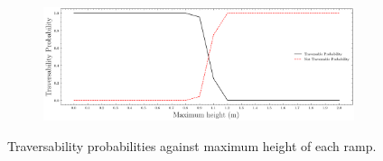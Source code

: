 \documentclass[../document.tex]{subfiles}
\begin{document}
\begin{figure}[htbp]
    \centering
    \begin{subfigure}[b]{1\linewidth}
    \includegraphics[width=\linewidth]{../img/5/custom_patches/ramp/predictions.png}
    \end{subfigure}
    \caption{Traversability probabilities against maximum height of each ramp.}
    \label{fig: ramps-preds}
\end{figure}
\end{document}
